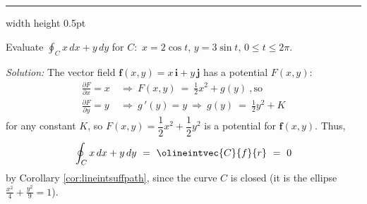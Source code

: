 
\vspace{3mm}
\hrule width \textwidth height 0.5pt
\begin{exa}
 Evaluate $\displaystyle\oint_C x\,dx + y\,dy$ for $C:$ $x=2\cos t$, $y=3\sin t$,
 $0\le t\le 2\pi$.\vspace{1mm}
 \par\noindent \emph{Solution:} The vector field $\textbf{f}(x,y) = x\,\textbf{i} + y\,\textbf{j}$ has a
 potential $F(x,y)$:
 \begin{align*}
  \frac{\partial F}{\partial x} = x ~&\Rightarrow~ F(x,y) ~=~ \frac{1}{2}x^2 + g(y) ~,\text{so}\\
  \frac{\partial F}{\partial y} = y ~&\Rightarrow~ g\,'(y) = y ~\Rightarrow~ g(y) ~=~ \frac{1}{2}y^2 + K
 \end{align*}
 for any constant $K$, so $F(x,y) = \dfrac{1}{2}x^2 + \dfrac{1}{2}y^2$ is a potential for $\textbf{f}(x,y)$. Thus,
 \begin{displaymath}
  \displaystyle\oint_C x\,dx + y\,dy ~=~ \displaystyle\olineintvec{C}{f}{r} ~=~ 0
 \end{displaymath}
 by Corollary \ref{cor:lineintsuffpath}, since the curve $C$ is closed (it is the ellipse
 $\frac{x^2}{4}+\frac{y^2}{9}=1$).
\end{exa}
